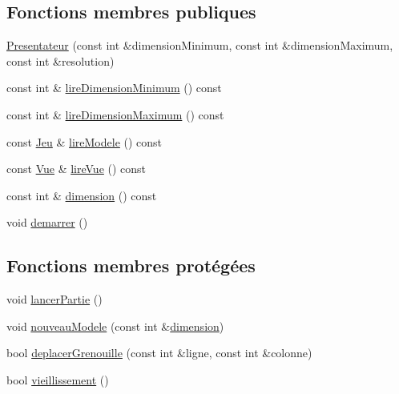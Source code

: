 \subsection*{Fonctions membres publiques}
\begin{DoxyCompactItemize}
\item 
\hyperlink{classgrenouilloland_1_1Presentateur_aee3b0dd4271204ff0ea084a8851dfc5c}{Presentateur} (const int \&dimension\-Minimum, const int \&dimension\-Maximum, const int \&resolution)
\item 
const int \& \hyperlink{classgrenouilloland_1_1Presentateur_ad63992b986dc5e6c072f06c28ad4ef07}{lire\-Dimension\-Minimum} () const 
\item 
const int \& \hyperlink{classgrenouilloland_1_1Presentateur_ad9b094d2e8e65893d4bdaf02de8fc133}{lire\-Dimension\-Maximum} () const 
\item 
const \hyperlink{classgrenouilloland_1_1Jeu}{Jeu} \& \hyperlink{classgrenouilloland_1_1Presentateur_aecb0257a4af119e65be331478306cdac}{lire\-Modele} () const 
\item 
const \hyperlink{classgrenouilloland_1_1Vue}{Vue} \& \hyperlink{classgrenouilloland_1_1Presentateur_a47dc8cbc54d21a96d6a4aefb80b54b8d}{lire\-Vue} () const 
\item 
const int \& \hyperlink{classgrenouilloland_1_1Presentateur_a129a00656b36c61645dcc517eb6170b3}{dimension} () const 
\item 
void \hyperlink{classgrenouilloland_1_1Presentateur_a965ce165d6b8244e17d81226a5848e2d}{demarrer} ()
\end{DoxyCompactItemize}
\subsection*{Fonctions membres protégées}
\begin{DoxyCompactItemize}
\item 
void \hyperlink{classgrenouilloland_1_1Presentateur_afe66f32c7193c158209006bfd8f40627}{lancer\-Partie} ()
\item 
void \hyperlink{classgrenouilloland_1_1Presentateur_a37a714909d1e1813a497fa2da716332b}{nouveau\-Modele} (const int \&\hyperlink{classgrenouilloland_1_1Presentateur_a129a00656b36c61645dcc517eb6170b3}{dimension})
\item 
bool \hyperlink{classgrenouilloland_1_1Presentateur_aa4463c4fdb04f4852ce8e2ff32b0fe0b}{deplacer\-Grenouille} (const int \&ligne, const int \&colonne)
\item 
bool \hyperlink{classgrenouilloland_1_1Presentateur_ab3e69b7a51f4cb235bce31ec168f802c}{vieillissement} ()
\end{DoxyCompactItemize}
